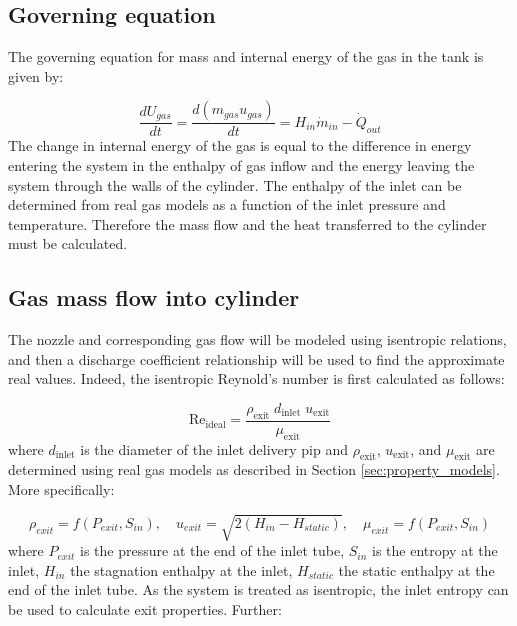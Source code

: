 


\subsection{Governing equation}

The governing equation for mass and internal energy of the gas in the tank is given by:

\begin{equation}
\frac{dU_{gas}}{dt} = \frac{d\left(m_{gas}u_{gas}\right)}{dt} = H_{in}\dot m_{in} - \dot Q_{out}
\end{equation}
The change in internal energy of the gas is equal to the difference in energy entering the system in the enthalpy of gas inflow and the energy leaving the system through the walls of the cylinder. The enthalpy of the inlet can be determined from real gas models as a function of the inlet pressure and temperature. Therefore the mass flow and the heat transferred to the cylinder must be calculated. 



\subsection{Gas mass flow into cylinder}

The nozzle and corresponding gas flow will be modeled using isentropic relations, and then a discharge coefficient relationship will be used to find the approximate real values. Indeed, the isentropic Reynold's number is first calculated as follows:

\begin{equation}
\text{Re}_{\text{ideal}} = \frac{\rho_{\text{exit}}\;d_{\text{inlet}}\;u_{\text{exit}}}{\mu_{\text{exit}}}
\end{equation}
where $d_{\text{inlet}}$ is the diameter of the inlet delivery pip and  $\rho_{\text{exit}}$, $u_{\text{exit}}$, and $\mu_{\text{exit}}$ are determined using real gas models as described in Section \ref{sec:property_models}. More specifically:

\begin{equation}
\rho_{exit} =  f\left(P_{exit}, S_{in}\right), \quad u_{exit} = \sqrt{2\left(H_{in} - H_{static}\right)}, \quad\mu_{exit}= f\left(P_{exit}, S_{in}\right)
\end{equation}
where $P_{exit}$ is the pressure at the end of the inlet tube, $S_{in}$ is the entropy at the inlet, $H_{in}$ the stagnation enthalpy at the inlet, $H_{static}$ the static enthalpy at the end of the inlet tube. As the system is treated as isentropic, the inlet entropy can be used to calculate exit properties. Further:

